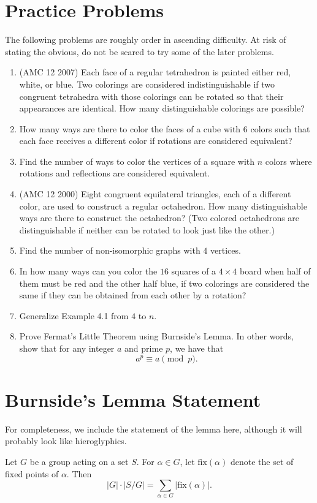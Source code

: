 \documentclass[11pt]{scrartcl}
\begin{document}
\newpage

\section{Practice Problems}

The following problems are roughly order in ascending difficulty. At risk of stating the obvious, do not be scared to try some of the later problems.

\begin{enumerate}
\item (AMC 12 2007) Each face of a regular tetrahedron is painted either red, white, or blue. Two colorings are considered indistinguishable if two congruent tetrahedra with those colorings can be rotated so that their appearances are identical. How many distinguishable colorings are possible?
\item How many ways are there to color the faces of a cube with $6$ colors such that each face receives a different color if rotations are considered equivalent?
\item Find the number of ways to color the vertices of a square with $n$ colors where rotations and reflections are considered equivalent.
\item (AMC 12 2000) Eight congruent equilateral triangles, each of a different color, are used to construct a regular octahedron. How many distinguishable ways are there to construct the octahedron? (Two colored octahedrons are distinguishable if neither can be rotated to look just like the other.)
\item Find the number of non-isomorphic graphs with $4$ vertices.
\item  In how many ways can you color the $16$ squares of a $4 \times 4$ board when half of them must be red and the other half blue, if two colorings are considered the same if they can be obtained from each other by a rotation?
\item Generalize Example 4.1 from $4$ to $n$.
\item Prove Fermat's Little Theorem using Burnside's Lemma. In other words, show that for any integer $a$ and prime $p$, we have that \[a^p \equiv a \pmod{p}.\]
\end{enumerate}

\section{Burnside's Lemma Statement}

For completeness, we include the statement of the lemma here, although it will probably look like hieroglyphics.

\begin{theorem*}
  Let $G$ be a group acting on a set $S$. For $\alpha \in G$, let $\text{fix}(\alpha)$ denote the set of fixed points of $\alpha$. Then\[\lvert G \rvert \cdot \lvert S/G \rvert = \sum_{\alpha \in G} \lvert \text{fix}(\alpha) \rvert .\]
\end{theorem*}
\end{document}
